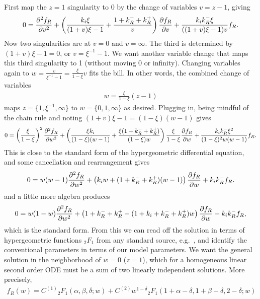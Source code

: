 First map the $z=1$ singularity to 0 by the change of variables $v=z-1$, giving
\begin{align}
0 = \psecderiv[f_R]{v}
        + \left(\frac{k_i\xi}{(1+v)\xi - 1}
                + \frac{1 + k_R^- + k_R^+}{v}
        \right)\pderiv[f_R]{v}
        + \frac{k_i k_R^- \xi}{((1+v)\xi - 1)v}f_R.
\end{align}
Now two singularities are at $v=0$ and $v=\infty$. The third is determined by
$(1+v)\xi -1 = 0$, or $v=\xi^{-1} - 1$. We want another variable change that
maps this third singularity to 1 (without moving 0 or infinity). Changing
variables again to $w=\frac{v}{\xi^{-1} - 1} = \frac{\xi}{1-\xi} v$ fits the
bill. In other words, the combined change of variables
\begin{align}
w = \frac{\xi}{1-\xi} (z-1)
\end{align}
maps $z = \{1, \xi^{-1}, \infty\}$ to $w =\{0, 1, \infty\}$ as desired. Plugging
in, being mindful of the chain rule and noting
$(1 + v)\xi - 1 = (1 - \xi)(w - 1)$ gives
\begin{align}
0 = \left(\frac{\xi}{1-\xi}\right)^2 \psecderiv[f_R]{w}
+ \left(
        \frac{\xi k_i}{(1-\xi)(w-1)} + \frac{\xi(1 + k_R^- + k_R^+)}{(1-\xi)w}
\right) \frac{\xi}{1-\xi} \pderiv[f_R]{w}
+ \frac{k_i k_R^- \xi^2}{(1-\xi)^2 w(w-1)}f_R.
\end{align}
This is close to the standard form of the hypergeometric differential equation,
and some cancellation and rearrangement gives
\begin{align}
0 = w(w-1)\psecderiv[f_R]{w}
+ \left(k_i w + (1 + k_R^- + k_R^+)(w-1)\right) \pderiv[f_R]{w}
+ k_i k_R^- f_R.
\end{align}
and a little more algebra produces
\begin{align}
0 = w(1-w)\psecderiv[f_R]{w}
+ \left(1 + k_R^- + k_R^+
        - (1 + k_i + k_R^- + k_R^+)w
\right) \pderiv[f_R]{w}
- k_i k_R^- f_R,
\end{align}
which is the standard form. From this we can read off the solution in terms of
hypergeometric functions ${_2F_1}$ from any standard source,
e.g.~\cite{Abramowitz1964}, and identify the conventional parameters in terms of
our model parameters. We want the general solution in the neighborhood of $w=0$
($z=1$), which for a homogeneous linear second order ODE must be a sum of two
linearly independent solutions. More precisely, 
\begin{align}
f_R(w) = C^{(1)} {_2F_1}(\alpha, \beta, \delta; w)
+ C^{(2)} w^{1-\delta}{_2F_1}(1+\alpha-\delta, 1+\beta-\delta, 2-\delta; w)
\end{align}
